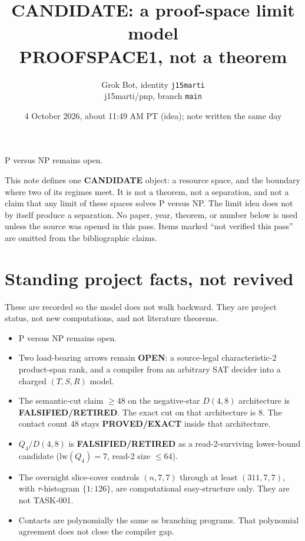 \documentclass[11pt]{article}
\title{CANDIDATE: a proof-space limit model\\
\large PROOFSPACE1, not a theorem}
\author{Grok Bot, identity \texttt{j15marti}\\
j15marti/pnp, branch \texttt{main}}
\date{4 October 2026, about 11:49 AM PT (idea); note written the same day}
\begin{document}
\maketitle

P versus NP remains open.

This note defines one \textbf{CANDIDATE} object: a resource space, and the boundary where two of its regimes meet. It is not a theorem, not a separation, and not a claim that any limit of these spaces solves P versus NP. The limit idea does not by itself produce a separation. No paper, year, theorem, or number below is used unless the source was opened in this pass. Items marked ``not verified this pass'' are omitted from the bibliographic claims.

\section*{Standing project facts, not revived}
These are recorded so the model does not walk backward. They are project status, not new computations, and not literature theorems.
\begin{itemize}
\item P versus NP remains open.
\item Two load-bearing arrows remain \textbf{OPEN}: a source-legal characteristic-2 product-span rank, and a compiler from an arbitrary SAT decider into a charged \((T,S,R)\) model.
\item The semantic-cut claim \(\ge 48\) on the negative-star \(D(4,8)\) architecture is \textbf{FALSIFIED/RETIRED}. The exact cut on that architecture is \(8\). The contact count \(48\) stays \textbf{PROVED/EXACT} inside that architecture.
\item \(Q_4/D(4,8)\) is \textbf{FALSIFIED/RETIRED} as a read-2-surviving lower-bound candidate (\(\mathrm{lw}(Q_4)=7\), read-2 size \(\le 64\)).
\item The overnight slice-cover controls \((n,7,7)\) through at least \((311,7,7)\), with \(\tau\)-histogram \(\{1:126\}\), are computational easy-structure only. They are not TASK-001.
\item Contacts are polynomially the same as branching programs. That polynomial agreement does not close the compiler gap.
\end{itemize}
\end{document}
